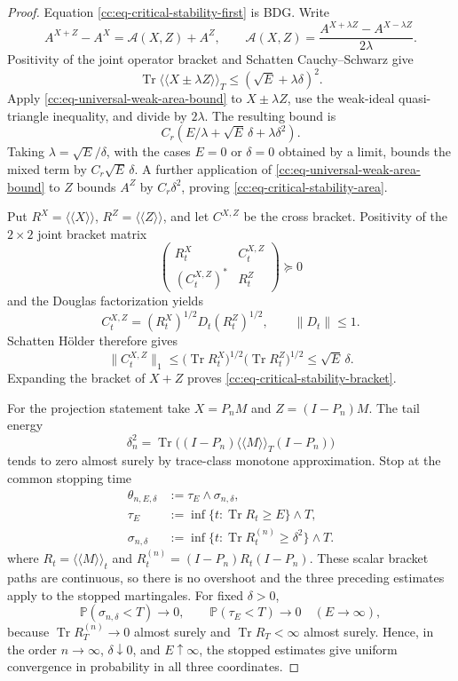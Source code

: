 \documentclass[10pt,reqno]{amsart}
\theoremstyle{plain}
\theoremstyle{definition}
\theoremstyle{remark}
\begin{document}
\begin{proof}
Equation \eqref{cc:eq-critical-stability-first} is BDG\@.  Write
\[
 A^{X+Z}-A^X=\mathcal A(X,Z)+A^Z,
 \qquad
 \mathcal A(X,Z)
 =\frac{A^{X+\lambda Z}-A^{X-\lambda Z}}{2\lambda}.
\]
Positivity of the joint operator bracket and Schatten Cauchy--Schwarz give
\[
 \operatorname{Tr}\langle\!\langle X\pm\lambda Z
 \rangle\!\rangle_T
 \leq(\sqrt E+\lambda\delta)^2.
\]
Apply \eqref{cc:eq-universal-weak-area-bound} to \(X\pm\lambda Z\), use
the weak-ideal quasi-triangle inequality, and divide by \(2\lambda\).
The resulting bound is
\[
 C_r(E/\lambda+\sqrt E\,\delta+\lambda\delta^2).
\]
Taking \(\lambda=\sqrt E/\delta\), with the cases \(E=0\) or
\(\delta=0\) obtained by a limit, bounds the mixed term by
\(C_r\sqrt E\,\delta\).  A further application of
\eqref{cc:eq-universal-weak-area-bound} to \(Z\) bounds \(A^Z\) by
\(C_r\delta^2\), proving \eqref{cc:eq-critical-stability-area}.

Put \(R^X=\langle\!\langle X\rangle\!\rangle\),
\(R^Z=\langle\!\langle Z\rangle\!\rangle\), and let \(C^{X,Z}\) be the
cross bracket.  Positivity of the \(2\times2\)
joint bracket matrix
\[
 \begin{pmatrix}
  R_t^X&C_t^{X,Z}\\
  (C_t^{X,Z})^*&R_t^Z
 \end{pmatrix}\succeq0
\]
and the Douglas factorization yields
\[
 C_t^{X,Z}=(R_t^X)^{1/2}D_t(R_t^Z)^{1/2},
 \qquad\|D_t\|\leq1.
\]
Schatten H\"older therefore gives
\[
 \|C_t^{X,Z}\|_1
 \leq
 \bigl(\operatorname{Tr}R_t^X\bigr)^{1/2}
 \bigl(\operatorname{Tr}R_t^Z\bigr)^{1/2}
 \leq\sqrt E\,\delta.
\]
Expanding the bracket of \(X+Z\) proves
\eqref{cc:eq-critical-stability-bracket}.

For the projection statement take \(X=P_nM\) and
\(Z=(I-P_n)M\).  The tail energy
\[
 \delta_n^2
 =\operatorname{Tr}\bigl((I-P_n)
 \langle\!\langle M\rangle\!\rangle_T(I-P_n)\bigr)
\]
tends to zero almost surely by trace-class monotone approximation.  Stop
at the common stopping time
\[
 \begin{aligned}
 \theta_{n,E,\delta}&:=\tau_E\wedge\sigma_{n,\delta},\\
 \tau_E&:=\inf\{t:\operatorname{Tr}R_t\geq E\}\wedge T,\\
 \sigma_{n,\delta}&:=
 \inf\{t:\operatorname{Tr}R_t^{(n)}\geq\delta^2\}\wedge T.
 \end{aligned}
\]
where
\(R_t=\langle\!\langle M\rangle\!\rangle_t\) and
\(R_t^{(n)}=(I-P_n)R_t(I-P_n)\).
These scalar bracket paths are continuous, so there is no overshoot and
the three preceding estimates apply to the stopped martingales.  For
fixed \(\delta>0\),
\[
 \mathbb P(\sigma_{n,\delta}<T)\longrightarrow0,
 \qquad
 \mathbb P(\tau_E<T)\longrightarrow0\quad(E\to\infty),
\]
because \(\operatorname{Tr}R_T^{(n)}\to0\) almost surely and
\(\operatorname{Tr}R_T<\infty\) almost surely.  Hence, in the order
\(n\to\infty\), \(\delta\downarrow0\), and \(E\uparrow\infty\), the
stopped estimates give uniform convergence in probability in all three
coordinates.


\end{proof}
\end{document}
